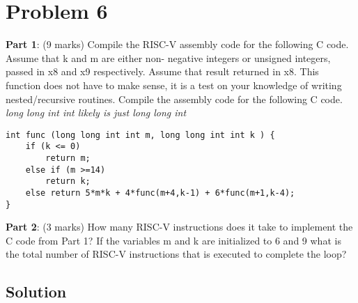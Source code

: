 \documentclass[11pt]{article}
\begin{document}
\section*{Problem 6}
\textbf{Part 1}: (9 marks) Compile the RISC-V assembly code for the following C code. Assume that k and m are either non-
negative integers or unsigned integers, passed in x8 and x9 respectively. Assume that result returned in x8. This function
does not have to make sense, it is a test on your knowledge of writing nested/recursive routines.
Compile the assembly code for the following C code. \textit{long long int int likely is just long long int}
\begin{lstlisting}
int func (long long int int m, long long int int k ) {
	if (k <= 0)
		return m;
	else if (m >=14)
		return k;
	else return 5*m*k + 4*func(m+4,k-1) + 6*func(m+1,k-4);
}
\end{lstlisting}
\textbf{Part 2}: (3 marks) How many RISC-V instructions does it take to implement the C code from Part 1? If the variables m
and k are initialized to 6 and 9 what is the total number of RISC-V instructions that is executed to complete the loop?

\subsection*{Solution}
\end{document}

